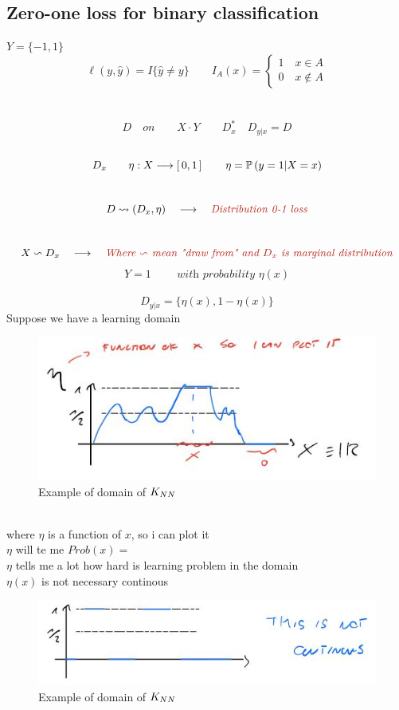 \documentclass[../main.tex]{subfiles}
\begin{document}
\subsection{Zero-one loss for binary classification}
$ Y = \{-1,1\}
$
$$
\ell(y,\hat{y}) = I \{ \hat{y} \neq y \} 
\qquad I_A (x) = 
\begin{cases}
1 \quad  x \in A
\\
0 \quad  x \not\in A
\end{cases}
$$
\\
\\
$$
D \quad on \qquad X \cdot Y \qquad D_x^* \quad D_{y|x} = D
$$\
$$
D_x \qquad \eta: X \longrightarrow \left[ \, 0,1 \, \right] \qquad \eta = \mathbb{P} \,(y = 1 | X = x )
$$\
$$
D \leadsto (D_x, \eta) \quad \longrightarrow \quad \red{\textit{Distribution 0-1 loss}}
$$\
$$
X \backsim D_x \quad \longrightarrow \quad \red{ \textit{Where $\backsim$ mean "draw from" and $D_x$ is marginal distribution} }  
$$
$$
Y = 1 \qquad \textit{   with probability } \eta(x)
$$\
$$
D_{y|x} = \{ \eta(x), 1- \eta(x) \}
$$
\newpage
Suppose we have a learning domain\\
\begin{figure}[h]
    \centering
    \includegraphics[width=0.6\linewidth]{../img/lez6-img1.JPG}
    \caption{Example of domain of $K_{NN}$}
\end{figure}
\\
where $\eta$ is a function of $x$, so i can plot it\\
$\eta$ will te me $Prob (x) = $
\\
$\eta$ tells me a lot how hard is learning problem in the domain
\\
$\eta(x)$ is not necessary continous
\\
\begin{figure}[h]
    \centering
    \includegraphics[width=0.6\linewidth]{../img/lez6-img2.JPG}
    \caption{Example of domain of $K_{NN}$}
\end{figure}
\end{document}

